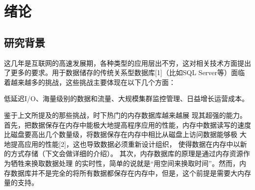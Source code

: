 \documentclass{zjutthesis}
\begin{document}



\frontmatter



\tableofcontents           %

\listoffigures             %
\listoftables              %


\mainmatter


\chapter{绪论}
\section{研究背景}
这几年是互联网的高速发展期，各种类型的应用层出不穷，这对相关技术方面提出了更多的要求。用于数据储存的传统关系型数据库[1]（比如SQL Server等）面临着越来越多的挑战，这些挑战主要体现在以下几个方面：

低延迟I/O、海量级别的数据和流量、大规模集群监控管理、日益增长运营成本。

鉴于上文所提及的那些挑战，时下热门的内存数据库越来越展
现其超强的能力。首先，把数据保存在内存中能极大地提高程序应用的性能，内存中数据读写的速度比磁盘要高出几个数量级，将数据保存在内存中相比从磁盘上访问数据能够极
大地提高应用的性能[2]，这也导致数据必须重新设计组织，
使得数据在内存中以新的方式存储（下文会做详细的介绍）。
其次，内存数据库的原理是通过内存资源作为牺牲来换取数据处理
的实时性，简单的说就是“用空间来换取时间”。然而，内存数据库并不是完全的将所有数据都保存在内存中，但是，这个前提是需要大内存量的支持。
\end{document}

